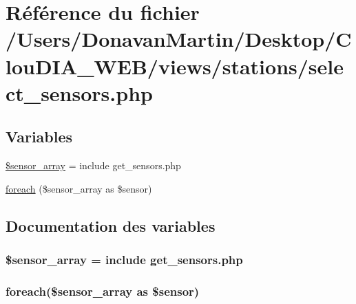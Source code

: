 \hypertarget{select__sensors_8php}{}\section{Référence du fichier /\+Users/\+Donavan\+Martin/\+Desktop/\+Clou\+D\+I\+A\+\_\+\+W\+E\+B/views/stations/select\+\_\+sensors.php}
\label{select__sensors_8php}
\subsection*{Variables}
\begin{DoxyCompactItemize}
\item 
\hyperlink{select__sensors_8php_a792d3eb606e13cbfa6c13d2a1ec73e87}{\$sensor\+\_\+array} = include \textquotesingle{}get\+\_\+sensors.\+php\textquotesingle{}
\item 
\hyperlink{select__sensors_8php_abeda163d9117b35ed83533ed6fc47225}{foreach} (\$sensor\+\_\+array as \$sensor)
\end{DoxyCompactItemize}


\subsection{Documentation des variables}
\hypertarget{select__sensors_8php_a792d3eb606e13cbfa6c13d2a1ec73e87}{}
\subsubsection[{\$sensor\+\_\+array}]{\setlength{\rightskip}{0pt plus 5cm}\$sensor\+\_\+array = include \textquotesingle{}get\+\_\+sensors.\+php\textquotesingle{}}\label{select__sensors_8php_a792d3eb606e13cbfa6c13d2a1ec73e87}
\hypertarget{select__sensors_8php_abeda163d9117b35ed83533ed6fc47225}{}
\subsubsection[{foreach}]{\setlength{\rightskip}{0pt plus 5cm}foreach(\$sensor\+\_\+array as \$sensor)}\label{select__sensors_8php_abeda163d9117b35ed83533ed6fc47225}

